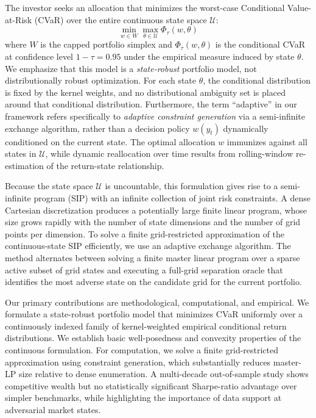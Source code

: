 \documentclass[smallextended]{svjour3}
\begin{document}
The investor seeks an allocation that minimizes the worst-case Conditional Value-at-Risk (CVaR) over the entire continuous state space $\mathcal{U}$:
\begin{equation}
    \min_{w \in W} \max_{\theta \in \mathcal{U}} \Phi_\tau(w, \theta)
\end{equation}
where $W$ is the capped portfolio simplex and $\Phi_\tau(w, \theta)$ is the conditional CVaR at confidence level $1-\tau = 0.95$ under the empirical measure induced by state $\theta$. We emphasize that this model is a \emph{state-robust} portfolio model, not distributionally robust optimization. For each state $\theta$, the conditional distribution is fixed by the kernel weights, and no distributional ambiguity set is placed around that conditional distribution. Furthermore, the term ``adaptive'' in our framework refers specifically to \emph{adaptive constraint generation} via a semi-infinite exchange algorithm, rather than a decision policy $w(y_t)$ dynamically conditioned on the current state. The optimal allocation $w$ immunizes against all states in $\mathcal{U}$, while dynamic reallocation over time results from rolling-window re-estimation of the return-state relationship.

Because the state space $\mathcal{U}$ is uncountable, this formulation gives rise to a semi-infinite program (SIP) with an infinite collection of joint risk constraints. A dense Cartesian discretization produces a potentially large finite linear
program, whose size grows rapidly with the number of state dimensions and
the number of grid points per dimension. To solve a finite grid-restricted approximation of the continuous-state SIP efficiently, we use an adaptive exchange algorithm. The method alternates between solving a finite master linear program over a sparse active subset of grid states and executing a full-grid separation oracle that identifies the most adverse state on the candidate grid for the current portfolio.

Our primary contributions are methodological, computational, and empirical.
We formulate a state-robust portfolio model that minimizes CVaR uniformly
over a continuously indexed family of kernel-weighted empirical conditional
return distributions. We establish basic well-posedness and convexity properties of the continuous formulation. For computation, we solve a finite grid-restricted approximation using constraint generation, which substantially reduces master-LP size relative to dense enumeration. A multi-decade out-of-sample study shows competitive wealth but no statistically significant Sharpe-ratio advantage over simpler benchmarks, while highlighting the importance of data support at adversarial market states.
\end{document}
